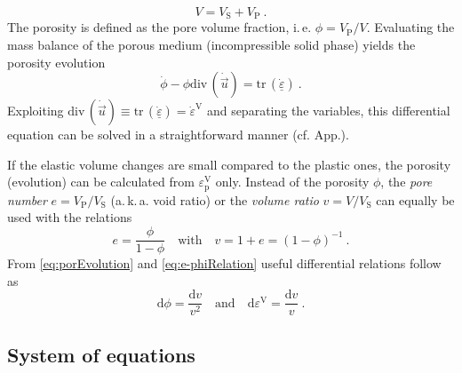 \documentclass[paper=a4, twoside, pagesize]{scrartcl}
\newcommand{\tensor}[1]{\underline{#1}}
\renewcommand{\d}{\text{d}}
\newcommand{\p}{\text{p}}
\newcommand{\with}{\text{with}}
\newcommand{\trace}{\mathrm{tr}\,}
\newcommand{\divergence}{\mathrm{div}\,}
\newcommand{\inv}{{-1}}
\begin{document}
\begin{equation}
  V = V_{\text{S}} + V_{\text{P}} \ .
\end{equation}
The porosity is defined as the pore volume fraction, i.\,e. $\phi=V_{\text{P}}/V$. Evaluating the mass balance of the porous medium (incompressible solid phase) yields the porosity evolution 
\begin{equation}\label{eq:porEvolution}
  \dot{\phi} - \phi\divergence(\dot{\vec u}) = \trace(\dot{\tensor\varepsilon})\ .
\end{equation}
Exploiting $\divergence(\dot{\vec u})\equiv \trace(\dot{\tensor\varepsilon})=\dot{\varepsilon}^\text{V}$ and separating the variables, this differential equation can be solved in a straightforward manner (cf. App.).

If the elastic volume changes are small compared to the plastic ones, the porosity (evolution) can be calculated from $\varepsilon^\text{V}_\p$ only. Instead of the porosity $\phi$, the \emph{pore number} $e=V_{\text{P}} / V_{\text{S}}$ (a.\,k.\,a. void ratio) or the \emph{volume ratio} $v=V / V_{\text{S}}$ can equally be used with the relations
\begin{equation}\label{eq:e-phiRelation}
  e = \frac{\phi}{1-\phi} \quad\with\quad v = 1+e = (1-\phi)^\inv \ .
\end{equation}
From \eqref{eq:porEvolution} and \eqref{eq:e-phiRelation} useful differential relations follow as
\begin{equation}\label{eq:diffRelations}
  \d\phi = \frac{\d v}{v^2} \quad\text{and}\quad \d\varepsilon^\text{V} = \frac{\d v}{v} \ .
\end{equation}

\subsection{System of equations}
\end{document}
